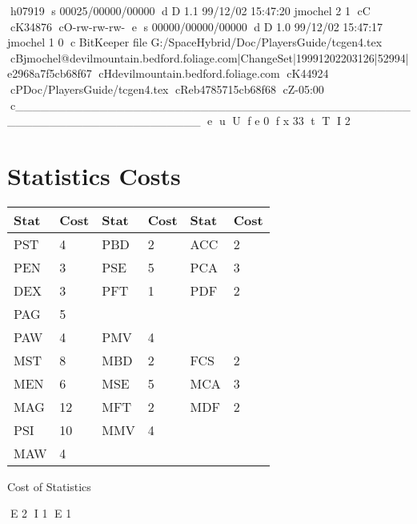 h07919
s 00025/00000/00000
d D 1.1 99/12/02 15:47:20 jmochel 2 1
cC
cK34876
cO-rw-rw-rw-
e
s 00000/00000/00000
d D 1.0 99/12/02 15:47:17 jmochel 1 0
c BitKeeper file G:/SpaceHybrid/Doc/PlayersGuide/tcgen4.tex
cBjmochel@devilmountain.bedford.foliage.com|ChangeSet|19991202203126|52994|e2968a7f5cb68f67
cHdevilmountain.bedford.foliage.com
cK44924
cPDoc/PlayersGuide/tcgen4.tex
cReb4785715cb68f68
cZ-05:00
c______________________________________________________________________
e
u
U
f e 0
f x 33
t
T
I 2
\section{Statistics Costs}

\begin{SHTable}[h]
	\begin{tabular}{llllll}
    Stat & Cost	&	Stat& Cost	& Stat	& Cost \\
\hline
	PST  & 4	&	PBD	&	2	&	ACC	&	2	\\
	PEN  & 3 	&	PSE	&	5	&	PCA	&	3	\\
	DEX  & 3	&	PFT	&	1	&	PDF	&	2	\\
	PAG  & 5	&		&		&		&		\\ 
	PAW	 & 4	&	PMV	&	4	&		&		\\
\hline	
	MST  & 8	&	MBD	&	2	&	FCS	&	2	\\
	MEN  & 6	&	MSE	&	5	&	MCA	&	3	\\
	MAG  & 12	&	MFT	&	2	&	MDF	&	2	\\
	PSI  & 10	&	MMV	&	4	&		&		\\ 
	MAW	 & 4	&		&		&		&		\\ 
	\end{tabular}
    \caption{Cost of Statistics}\label{Table:StatCosts}
\end{SHTable}


E 2
I 1
E 1
